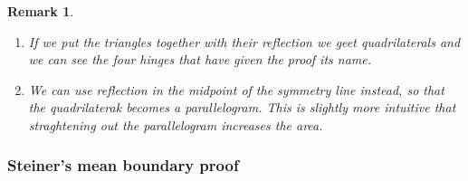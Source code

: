 \documentclass[12pt, a4paper, titlepage]{article}
\newtheorem{remark}{Remark}
\begin{document}
\begin{remark} \
\begin{enumerate}
\item[a)] If we put the triangles together with their reflection we geet quadrilaterals and we can see the four hinges that have given the proof its name. 
\item[b)] We can use reflection in the midpoint of the symmetry line instead, so that the quadrilaterak becomes a parallelogram. This is slightly more intuitive that straghtening out the parallelogram increases the area.
\end{enumerate}

\end{remark}

\subsubsection*{Steiner's mean boundary proof}
\end{document}
